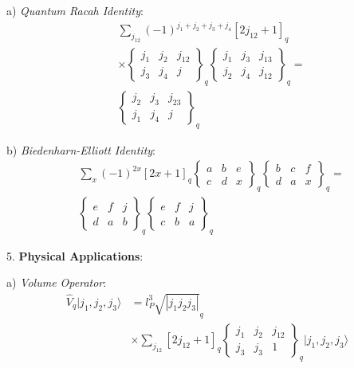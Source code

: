 \documentclass[12pt,a4paper]{article}
\begin{document}
   a) \textit{Quantum Racah Identity}:
      \[
      \begin{aligned}
      &\sum_{j_{12}} (-1)^{j_1+j_2+j_3+j_4} [2j_{12}+1]_q \\
      &\times \begin{Bmatrix} j_1 & j_2 & j_{12} \\ j_3 & j_4 & j \end{Bmatrix}_q \begin{Bmatrix} j_1 & j_3 & j_{13} \\ j_2 & j_4 & j_{12} \end{Bmatrix}_q = \\
      &\begin{Bmatrix} j_2 & j_3 & j_{23} \\ j_1 & j_4 & j \end{Bmatrix}_q
      \end{aligned}
      \]
   
   b) \textit{Biedenharn-Elliott Identity}:
      \[
      \begin{aligned}
      &\sum_{x} (-1)^{2x} [2x+1]_q \begin{Bmatrix} a & b & e \\ c & d & x \end{Bmatrix}_q \begin{Bmatrix} b & c & f \\ d & a & x \end{Bmatrix}_q = \\
      &\begin{Bmatrix} e & f & j \\ d & a & b \end{Bmatrix}_q \begin{Bmatrix} e & f & j \\ c & b & a \end{Bmatrix}_q
      \end{aligned}
      \]

5. \textbf{Physical Applications}:
   
   a) \textit{Volume Operator}:
      \[
      \begin{aligned}
      \hat{V}_q|j_1,j_2,j_3\rangle &= l_P^3\sqrt{|j_1j_2j_3|}_q \\
      &\times \sum_{j_{12}} [2j_{12}+1]_q \begin{Bmatrix} j_1 & j_2 & j_{12} \\ j_3 & j_3 & 1 \end{Bmatrix}_q |j_1,j_2,j_3\rangle
      \end{aligned}
      \]
   
\end{document}
